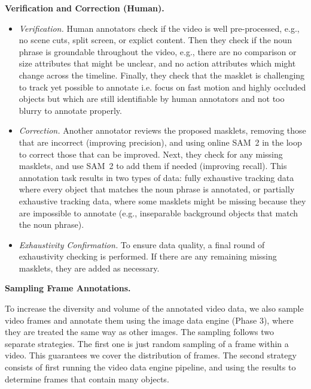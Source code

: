 \documentclass[]{fairmeta}
\newcommand{\eg}{e.g., }
\newcommand{\samtwo}{SAM~2\xspace}
\renewcommand{\paragraph}[1]{%
	\noindent\textbf{#1.}\noindent\xspace%
}
\begin{document}
\paragraph{Verification and Correction (Human)}
\begin{itemize}
	\item \textit{Verification.} Human annotators check if the video is well pre-processed, \eg no scene cuts, split screen, or explict content. Then they check if the noun phrase is groundable throughout the video, \eg there are no comparison or size attributes that might be unclear, and no action attributes which might change across the timeline. Finally, they check that the masklet is challenging to track yet possible to annotate i.e. focus on fast motion and highly occluded objects but which are still identifiable by human annotators and not too blurry to annotate properly.
	\item \textit{Correction.} Another annotator reviews the proposed masklets, removing those that are incorrect (improving precision), and using online \samtwo in the loop to correct those that can be improved. Next, they check for any missing masklets, and use \samtwo to add them if needed (improving recall). This annotation task results in two types of data: fully exhaustive tracking data where every object that matches the noun phrase is annotated, or partially exhaustive tracking data, where some masklets might be missing because they are impossible to annotate (\eg inseparable background objects that match the noun phrase).
	\item \textit{Exhaustivity Confirmation.} To ensure data quality, a final round of exhaustivity checking is performed. If there are any remaining missing masklets, they are added as necessary.
\end{itemize}


\paragraph{Sampling Frame Annotations}
To increase the diversity and volume of the annotated video data, we also sample video frames and annotate them using the image data engine (Phase 3), where they are treated the same way as other images. The sampling follows two separate strategies. The first one is just random sampling of a frame within a video. This guarantees we cover the distribution of frames. The second strategy consists of first running the video data engine pipeline, and using the results to determine frames that contain many objects. 
\end{document}
